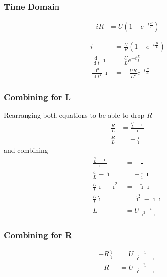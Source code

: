 \documentclass[12pt,a4paper,oneside,openany]{article}
\DeclareMathOperator{\ud}{d}
\begin{document}
\subsubsection{Time Domain}

\begin{align}
i R&= U \left( 1 - e^{-t\frac{R}{L}} \right)
\end{align}


\begin{align}
i &= \frac{U}{R} \left( 1 - e^{-t\frac{R}{L}} \right) \\
\frac{\ud}{\ud t} \imath &= \frac{U}{L} e^{-t\frac{R}{L}} \\
\frac{\ud^2}{\ud t^2} \imath &= -\frac{UR}{L^2} e^{-t\frac{R}{L}}
\end{align}

\subsubsection{Combining for L}

Rearranging both equations to be able to drop $R$
\begin{align}
\frac{R}{L} &= \frac{\frac{U}{L} - \dot{\imath}}{\imath} \\
\frac{R}{L} &= - \frac{ \ddot{\imath}}{ \dot{\imath}}
\end{align}
and combining
\begin{align}
\frac{\frac{U}{L} -  \dot{\imath}}{\imath} &= - \frac{\ddot{\imath}}{ \dot{\imath}} \\
\frac{U}{L} -  \dot{\imath} &= - \frac{\ddot{\imath}}{\dot{\imath}} \imath \\
\frac{U}{L}  \dot{\imath} - \dot{\imath}^2 &= - \ddot{\imath} \imath \\
\frac{U}{L}  \dot{\imath} &= \dot{\imath}^2 - \ddot{\imath} \imath \\
L &= U \frac{ \dot{\imath}}{ \dot{\imath}^2 - \ddot{\imath} \imath}
\end{align}

\subsubsection{Combining for R}
\begin{align}
- R \frac{\dot{\imath}}{\ddot{\imath}} &= U \frac{ \dot{\imath}}{ \dot{\imath}^2 - \ddot{\imath} \imath} \\
- R &= U \frac{ \ddot{\imath}}{ \dot{\imath}^2 - \ddot{\imath} \imath}
\end{align}
\end{document}

